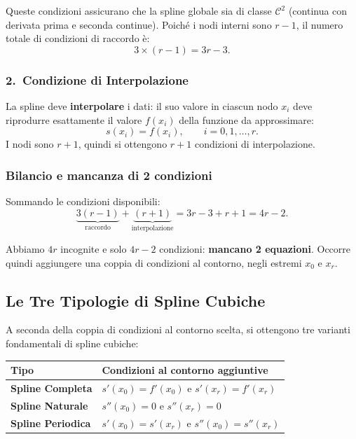 \documentclass[a4paper,12pt]{article}
\theoremstyle{definition}
\theoremstyle{remark}
\begin{document}
Queste condizioni assicurano che la spline globale sia di classe
$\mathcal{C}^2$ (continua con derivata prima e seconda continue). Poiché
i nodi interni sono $r - 1$, il numero totale di condizioni di raccordo è:
\[
  3 \times (r - 1) = 3r - 3.
\]

\subsubsection*{2.\ Condizione di Interpolazione}

La spline deve \textbf{interpolare} i dati: il suo valore in ciascun
nodo $x_i$ deve riprodurre esattamente il valore $f(x_i)$ della funzione
da approssimare:
\[
  s(x_i) = f(x_i), \qquad i = 0, 1, \ldots, r.
\]
I nodi sono $r + 1$, quindi si ottengono $r + 1$ condizioni di interpolazione.

\subsubsection*{Bilancio e mancanza di 2 condizioni}

Sommando le condizioni disponibili:
\[
  \underbrace{3(r-1)}_{\text{raccordo}}
  + \underbrace{(r+1)}_{\text{interpolazione}}
  = 3r - 3 + r + 1 = 4r - 2.
\]

Abbiamo $4r$ incognite e solo $4r - 2$ condizioni: \textbf{mancano 2
equazioni}. Occorre quindi aggiungere una coppia di condizioni al
contorno, negli estremi $x_0$ e $x_r$.

\subsection{Le Tre Tipologie di Spline Cubiche}

A seconda della coppia di condizioni al contorno scelta, si ottengono tre
varianti fondamentali di spline cubiche:

\begin{center}
\begin{tabular}{|l|l|}
\hline
\textbf{Tipo} & \textbf{Condizioni al contorno aggiuntive} \\
\hline
\textbf{Spline Completa} &
  $s'(x_0) = f'(x_0)$ \quad e \quad $s'(x_r) = f'(x_r)$ \\
\hline
\textbf{Spline Naturale} &
  $s''(x_0) = 0$ \quad e \quad $s''(x_r) = 0$ \\
\hline
\textbf{Spline Periodica} &
  $s'(x_0) = s'(x_r)$ \quad e \quad $s''(x_0) = s''(x_r)$ \\
\hline
\end{tabular}
\end{center}
\end{document}
